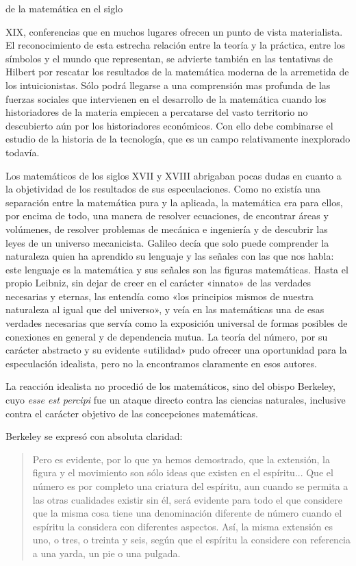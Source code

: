 \documentclass[a4paper, 12pt]{article}
\begin{document}
de la matemática en el siglo {XIX, conferencias que en muchos lugares ofrecen un
punto de vista materialista. El reconocimiento de esta estrecha relación entre
la teoría y la práctica, entre los símbolos y el mundo que representan, se
advierte también en las tentativas de Hilbert por rescatar los resultados de la
matemática moderna de la arremetida de los intuicionistas.  Sólo podrá llegarse
a una comprensión mas profunda de las fuerzas sociales que intervienen en el
desarrollo de la matemática cuando los historiadores de la materia empiecen a
percatarse del vasto territorio no descubierto aún por los historiadores
económicos. Con ello debe combinarse el estudio de la historia de la tecnología,
que es un campo relativamente inexplorado todavía.

Los matemáticos de los siglos XVII y XVIII abrigaban pocas dudas en cuanto a la
objetividad de los resultados de sus especulaciones. Como no existía una
separación entre la matemática pura y la aplicada, la matemática era para ellos,
por encima de todo, una manera de resolver ecuaciones, de encontrar áreas y
volúmenes, de resolver problemas de mecánica e ingeniería y de descubrir las
leyes de un universo mecanicista. Galileo decía que solo puede comprender la
naturaleza quien ha aprendido su lenguaje y las señales con las que nos habla:
este lenguaje es la matemática y sus señales son las figuras matemáticas. Hasta
el propio Leibniz, sin dejar de creer en el carácter «innato» de las verdades
necesarias y eternas, las entendía como «los principios mismos de nuestra
naturaleza al igual que del universo», y veía en las matemáticas una de esas
verdades necesarias que servía como la exposición universal de formas posibles
de conexiones en general y de dependencia mutua. La teoría del número, por su
carácter abstracto y su evidente «utilidad» pudo ofrecer una oportunidad para la
especulación idealista, pero no la encontramos claramente en esos autores.

La reacción idealista no procedió de los matemáticos, sino del obispo Berkeley,
cuyo \textit{esse est percipi} fue un ataque directo contra las ciencias
naturales, inclusive contra el carácter objetivo de las concepciones
matemáticas.

Berkeley se expresó con absoluta claridad:

\begin{quote}\small Pero es evidente, por lo que ya hemos demostrado, que la
extensión, la figura y el movimiento son sólo ideas que existen en el
espíritu... Que el número es por completo una criatura del espíritu, aun cuando
se permita a las otras cualidades existir sin él, será evidente para todo el que
considere que la misma cosa tiene una denominación diferente de número cuando el
espíritu la considera con diferentes aspectos. Así, la misma extensión es uno, o
tres, o treinta y seis, según que el espíritu la considere con referencia a una
yarda, un pie o una pulgada. \end{quote}

}
\end{document}
